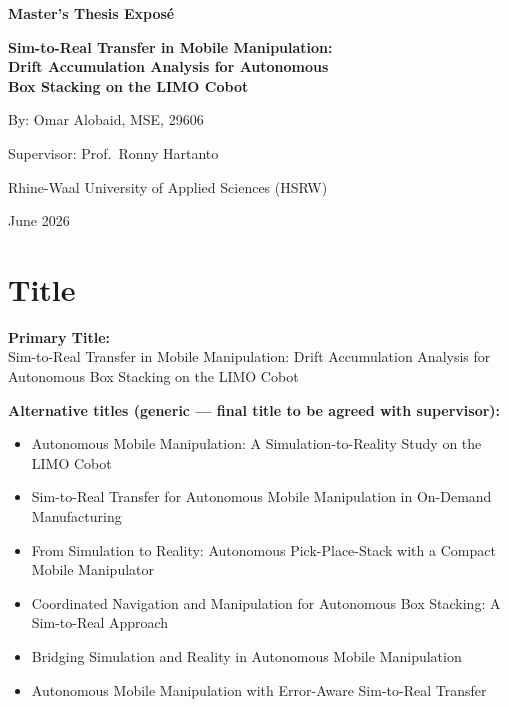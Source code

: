 \documentclass[11pt,a4paper]{article}
\begin{document}
\begin{center}
    \vspace*{1cm}
    {\Huge\bfseries\color{heading} Master's Thesis Expos\'{e}\par}
    \vspace{0.6cm}
    {\Large\bfseries\color{primary}
        Sim-to-Real Transfer in Mobile Manipulation:\\
        Drift Accumulation Analysis for Autonomous\\
        Box Stacking on the LIMO Cobot\par}
    \vspace{1cm}
    {\large By: Omar Alobaid, MSE, 29606\par}
    \vspace{0.2cm}
    {\large Supervisor: Prof.\ Ronny Hartanto\par}
    \vspace{0.2cm}
    {\large Rhine-Waal University of Applied Sciences (HSRW)\par}
    \vspace{0.2cm}
    {\large June 2026\par}
    \vspace*{1.5cm}
\end{center}

\section{Title}

\begin{tcolorbox}[colback=boxbg, colframe=primary, arc=3pt, boxrule=1.5pt,
    left=1em, right=1em, top=0.8em, bottom=0.8em]
    \textbf{Primary Title:}\\[0.3em]
    {\large Sim-to-Real Transfer in Mobile Manipulation: Drift Accumulation
    Analysis for Autonomous Box Stacking on the LIMO Cobot}
\end{tcolorbox}

\vspace{0.5em}
\noindent\textbf{Alternative titles (generic --- final title to be agreed with supervisor):}
\begin{itemize}[label=\textbullet, leftmargin=1.5em]
    \item Autonomous Mobile Manipulation: A Simulation-to-Reality Study on the LIMO Cobot
    \item Sim-to-Real Transfer for Autonomous Mobile Manipulation in On-Demand Manufacturing
    \item From Simulation to Reality: Autonomous Pick-Place-Stack with a Compact Mobile Manipulator
    \item Coordinated Navigation and Manipulation for Autonomous Box Stacking: A Sim-to-Real Approach
    \item Bridging Simulation and Reality in Autonomous Mobile Manipulation
    \item Autonomous Mobile Manipulation with Error-Aware Sim-to-Real Transfer
\end{itemize}
\end{document}
